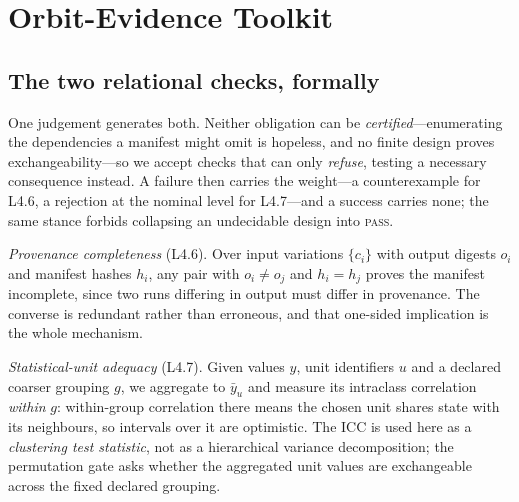 \documentclass[conference]{IEEEtran}
\newcommand{\rulename}[1]{\textsf{#1}}
\begin{document}
\section{Orbit-Evidence Toolkit}



\subsection{The two relational checks, formally}

One judgement generates both. Neither obligation can be \emph{certified}---enumerating the
dependencies a manifest might omit is hopeless, and no finite design proves exchangeability---so we
accept checks that can only \emph{refuse}, testing a necessary consequence instead. A failure then carries the weight---a counterexample for \rulename{L4.6}, a rejection at the
nominal level for \rulename{L4.7}---and a success carries none; the same stance forbids collapsing
an undecidable design into \textsc{pass}.

\emph{Provenance completeness} (\rulename{L4.6}). Over input variations $\{c_i\}$ with output
digests $o_i$ and manifest hashes $h_i$, any pair with $o_i \neq o_j$ and $h_i = h_j$ proves the
manifest incomplete, since two runs differing in output must differ in provenance. The converse is
redundant rather than erroneous, and that one-sided implication is the whole mechanism.

\emph{Statistical-unit adequacy} (\rulename{L4.7}). Given values $y$, unit identifiers $u$ and a
declared coarser grouping $g$, we aggregate to $\bar{y}_u$ and measure its intraclass correlation
\emph{within} $g$: within-group correlation there means the chosen unit shares state with its
neighbours, so intervals over it are optimistic. The ICC is used here as a \emph{clustering test
statistic}, not as a hierarchical variance decomposition; the permutation gate asks whether the
aggregated unit values are exchangeable across the fixed declared grouping.
\end{document}
